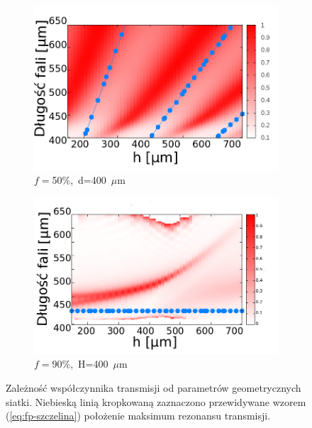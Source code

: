 \begin{figure}[tb]
\begin{subfigure}{0.45\textwidth}
	\includegraphics[width=\textwidth]{images/antenaThz/rezonant_trans_f05.png}
	\caption{$f=$50\%,~d=400~$\mu$m }
	\label{fig:rezof05}
\end{subfigure}
\begin{subfigure}{0.45\textwidth}
	\includegraphics[width=\textwidth]{images/antenaThz/rez_trans_L.png}
	\caption{$f=$90\%,~H=400~$\mu$m}
	\label{fig:rezL}
\end{subfigure}

\caption{Zależność współczynnika transmisji od parametrów geometrycznych siatki. Niebieską linią kropkowaną zaznaczono przewidywane wzorem (\ref{eq:fp-szczelina}) położenie maksimum rezonansu transmisji. }
\label{fig:wyn-rezo-siat-H}
\end{figure}

